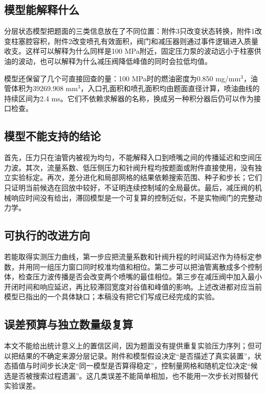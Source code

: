 \documentclass[UTF8,11pt,a4paper]{ctexart}
\begin{document}
\subsection{模型能解释什么}

分层状态模型把题面的三类信息放在了不同位置：附件3只改变状态转换，附件1改变柱塞腔容积，附件2改变喷孔有效面积，阀门和减压器则通过事件逻辑进入质量收支。这样可以解释为什么同样是100 MPa附近，固定压力泵的波动远小于柱塞供油的波动，也可以解释为什么减压阀降低峰值的同时会拉低均值。

模型还保留了几个可直接回查的量：100 MPa时的燃油密度为0.850 mg/mm$^3$，油管体积为39269.908 mm$^3$，入口孔面积和喷孔面积均由题面直径计算，喷油曲线的持续区间为2.4 ms。它们不依赖求解器的名称，换成另一种积分器后仍可以作为接口检查。

\subsection{模型不能支持的结论}

首先，压力只在油管内被视为均匀，不能解释入口到喷嘴之间的传播延迟和空间压力波。其次，流量系数、低压侧压力和针阀升程均按题面或附件直接使用，没有独立实验标定。再次，差分进化和局部网格的结果依赖搜索范围、种子和步长；它们只证明当前候选在回放中较好，不证明连续控制域的全局最优。最后，减压阀的机械响应时间没有给出，滞回模型是一个可复算的控制近似，不是实物阀门的完整动力学。

\subsection{可执行的改进方向}

若能取得实测压力曲线，第一步应把流量系数和针阀升程的时间延迟作为待标定参数，并用同一组压力窗口同时校准均值和相位。第二步可以把油管离散成多个控制体，检查压力波传播是否会改变两个喷嘴的最佳相位。第三步在减压阀中加入最小开闭时间和响应延迟，再比较滞回宽度对谷值和峰值的影响。上述改进都对应当前模型已指出的一个具体缺口；本稿没有把它们写成已经完成的实验。

\subsection{误差预算与独立数量级复算}

本文不能给出统计意义上的置信区间，因为题面没有提供重复实验压力序列；但可以把结果的不确定来源分层记录。附件和模型假设决定“是否描述了真实装置”，状态插值与时间步长决定“同一模型是否算得稳定”，控制量网格和随机定位决定“候选是否被搜索过程遗漏”。这几类误差不能简单相加，也不能用一次步长对照替代实验误差。
\end{document}
